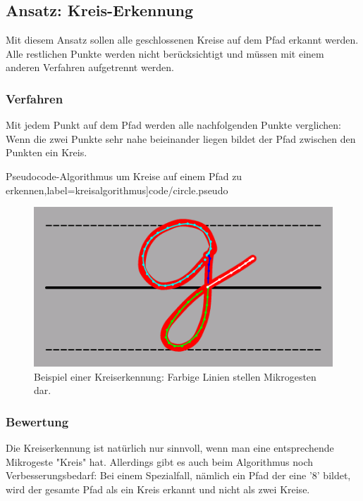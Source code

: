 
\subsection{Ansatz: Kreis-Erkennung}
Mit diesem Ansatz sollen alle geschlossenen Kreise auf dem Pfad erkannt werden. Alle restlichen Punkte werden nicht berücksichtigt und müssen mit einem anderen Verfahren aufgetrennt werden.

\subsubsection{Verfahren}
Mit jedem Punkt auf dem Pfad werden alle nachfolgenden Punkte verglichen: Wenn die zwei Punkte sehr nahe beieinander liegen bildet der Pfad zwischen den Punkten ein Kreis.

{Pseudocode-Algorithmus um Kreise auf einem Pfad zu erkennen},label=kreisalgorithmus]{code/circle.pseudo}

\begin{figure}[h!]
  \centering
    \includegraphics[scale=0.5]{./img/circle_beispiel.png}
  \caption{Beispiel einer Kreiserkennung: Farbige Linien stellen Mikrogesten dar.}
  \label{kreis_trennung}
\end{figure}

\subsubsection{Bewertung}
Die Kreiserkennung ist natürlich nur sinnvoll, wenn man eine entsprechende Mikrogeste "Kreis" hat. Allerdings gibt es auch beim Algorithmus noch Verbesserungsbedarf: Bei einem Spezialfall, nämlich ein Pfad der eine '8' bildet, wird der gesamte Pfad als ein Kreis erkannt und nicht als zwei Kreise. 


